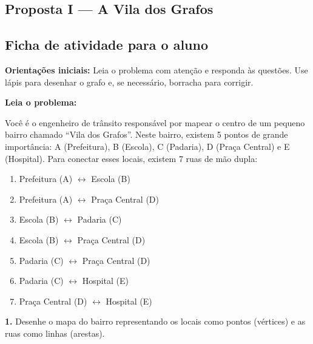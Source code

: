 \documentclass[
  12pt,
  oneside,
  a4paper,
  english,
  brazilian
  ]{abntex2}
\theoremstyle{definition}
\def\vspace#1{ }%
\begin{document}
\begin{apendicesenv}
\partapendices

\chapter{Proposta I --- A Vila dos Grafos}
\label{apendice:vila}

\section{Ficha de atividade para o aluno}

\textbf{Orientações iniciais:} Leia o problema com atenção e responda às questões. Use lápis para desenhar o grafo e, se necessário, borracha para corrigir.

\medskip

\textbf{Leia o problema:}

Você é o engenheiro de trânsito responsável por mapear o centro de um pequeno bairro chamado ``Vila dos Grafos''. Neste bairro, existem 5 pontos de grande importância: A (Prefeitura), B (Escola), C (Padaria), D (Praça Central) e E (Hospital). Para conectar esses locais, existem 7 ruas de mão dupla:

\begin{enumerate}[noitemsep]
  \item Prefeitura (A) $\leftrightarrow$ Escola (B)
  \item Prefeitura (A) $\leftrightarrow$ Praça Central (D)
  \item Escola (B) $\leftrightarrow$ Padaria (C)
  \item Escola (B) $\leftrightarrow$ Praça Central (D)
  \item Padaria (C) $\leftrightarrow$ Praça Central (D)
  \item Padaria (C) $\leftrightarrow$ Hospital (E)
  \item Praça Central (D) $\leftrightarrow$ Hospital (E)
\end{enumerate}

\textbf{1.} Desenhe o mapa do bairro representando os locais como pontos (vértices) e as ruas como linhas (arestas).

\vspace{4cm}


\end{apendicesenv}
\end{document}
